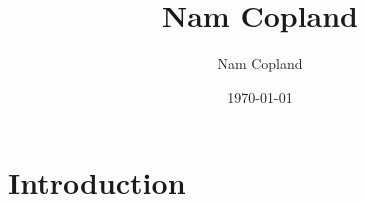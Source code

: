 \documentclass{article}
\title{Nam Copland}
\author{Nam Copland}
\date{\today}
\begin{document}
\maketitle

\section{Introduction}
\end{document}
